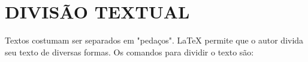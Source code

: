 
\chapter{DIVISÃO TEXTUAL}

Textos costumam ser separados em "pedaços".
\LaTeX{} permite que o autor divida seu texto de diversas formas.
Os comandos para dividir o texto são:

